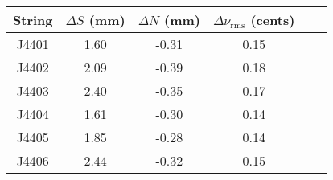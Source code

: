 \begin{tabular}{cccccc}
\toprule
String & $\Delta S$ (mm) & $\Delta N$ (mm) & $\overline{\Delta \nu}_\text{rms}$ (cents) \\
\midrule
J4401 & 1.60 & -0.31 & 0.15 \\
J4402 & 2.09 & -0.39 & 0.18 \\
J4403 & 2.40 & -0.35 & 0.17 \\
J4404 & 1.61 & -0.30 & 0.14 \\
J4405 & 1.85 & -0.28 & 0.14 \\
J4406 & 2.44 & -0.32 & 0.15 \\
\bottomrule
\end{tabular}

